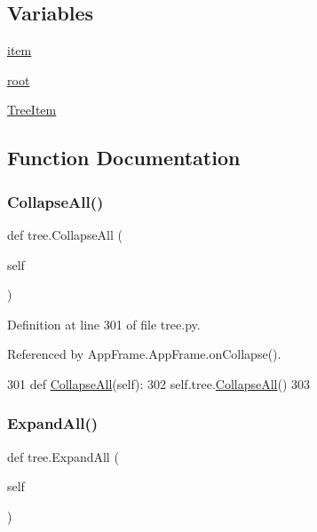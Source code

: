 \subsection*{Variables}
\begin{DoxyCompactItemize}
\item 
\hyperlink{namespacetree_a2b39c5c8d8b749cd12223e1f89868f11}{item}
\item 
\hyperlink{namespacetree_a5aa7b029446af06b022d8390bedf39fd}{root}
\item 
\hyperlink{namespacetree_ad25a722efe4d4e2f98ec1f6a6c92b4b9}{Tree\+Item}
\end{DoxyCompactItemize}


\subsection{Function Documentation}
\mbox{\label{namespacetree_a8440c45c468184b3cc385934d03bf96f}} 
\subsubsection{\texorpdfstring{Collapse\+All()}{CollapseAll()}}
{\footnotesize\ttfamily def tree.\+Collapse\+All (\begin{DoxyParamCaption}\item[{}]{self }\end{DoxyParamCaption})}



Definition at line 301 of file tree.\+py.



Referenced by App\+Frame.\+App\+Frame.\+on\+Collapse().


\begin{DoxyCode}
301     \textcolor{keyword}{def }\hyperlink{namespacetree_a8440c45c468184b3cc385934d03bf96f}{CollapseAll}(self):
302         self.tree.\hyperlink{namespacetree_a8440c45c468184b3cc385934d03bf96f}{CollapseAll}()
303 \end{DoxyCode}
\mbox{\label{namespacetree_a68fefd05a9fba45bef73547aabebed51}} 
\subsubsection{\texorpdfstring{Expand\+All()}{ExpandAll()}}
{\footnotesize\ttfamily def tree.\+Expand\+All (\begin{DoxyParamCaption}\item[{}]{self }\end{DoxyParamCaption})}



